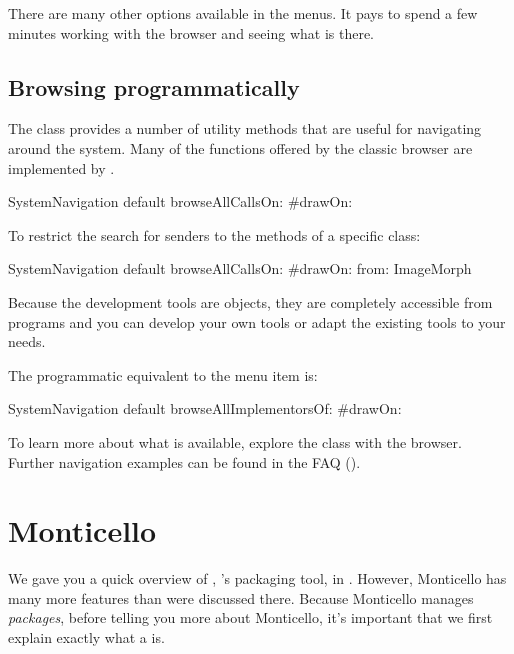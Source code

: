 \documentclass[a4paper,10pt,twoside]{book}
\begin{document}

There are many other options available in the menus.  It pays to spend a few minutes working with the browser and seeing what is there.   


\subsection{Browsing programmatically}

The class  provides a number of utility methods that are useful for navigating around the system.
Many of the functions offered by the classic browser are implemented by .

\begin{code}{}
SystemNavigation default browseAllCallsOn: #drawOn:
\end{code}
To restrict the search for senders to the methods of a specific class:
\begin{code}{}
SystemNavigation default browseAllCallsOn: #drawOn: from: ImageMorph
\end{code}
Because the development tools are objects, they are completely accessible from programs and you can develop your own tools or adapt the existing tools to your needs.

The programmatic equivalent to the  menu item is:
\begin{code}{}
SystemNavigation default browseAllImplementorsOf: #drawOn:
\end{code}

To learn more about what is available, explore the class  with the browser.
Further navigation examples can be found in the FAQ ().

\section{Monticello}

We gave you a quick overview of , \pharo's packaging tool, in .  
However, Monticello has many more features than were discussed there.  
Because Monticello manages \emph{packages}, before telling you more about Monticello, it's important that we first explain exactly what a  is.
\end{document}
